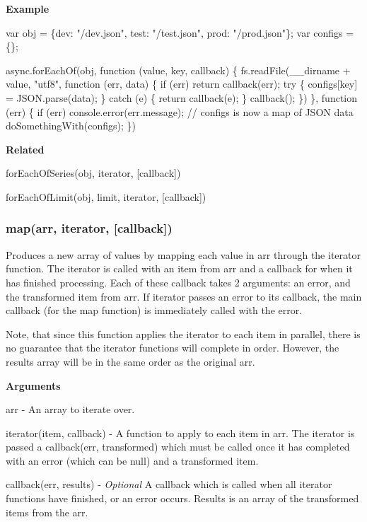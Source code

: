 {\bfseries Example}


\begin{DoxyCode}
var obj = \{dev: "/dev.json", test: "/test.json", prod: "/prod.json"\};
var configs = \{\};

async.forEachOf(obj, function (value, key, callback) \{
  fs.readFile(\_\_dirname + value, "utf8", function (err, data) \{
    if (err) return callback(err);
    try \{
      configs[key] = JSON.parse(data);
    \} catch (e) \{
      return callback(e);
    \}
    callback();
  \})
\}, function (err) \{
  if (err) console.error(err.message);
  // configs is now a map of JSON data
  doSomethingWith(configs);
\})
\end{DoxyCode}


{\bfseries Related}


\begin{DoxyItemize}
\item for\+Each\+Of\+Series(obj, iterator, \mbox{[}callback\mbox{]})
\item for\+Each\+Of\+Limit(obj, limit, iterator, \mbox{[}callback\mbox{]}) 


\end{DoxyItemize}

\label{_map}%
 \subsubsection*{map(arr, iterator, \mbox{[}callback\mbox{]})}

Produces a new array of values by mapping each value in {\ttfamily arr} through the {\ttfamily iterator} function. The {\ttfamily iterator} is called with an item from {\ttfamily arr} and a callback for when it has finished processing. Each of these callback takes 2 arguments\+: an {\ttfamily error}, and the transformed item from {\ttfamily arr}. If {\ttfamily iterator} passes an error to its callback, the main {\ttfamily callback} (for the {\ttfamily map} function) is immediately called with the error.

Note, that since this function applies the {\ttfamily iterator} to each item in parallel, there is no guarantee that the {\ttfamily iterator} functions will complete in order. However, the results array will be in the same order as the original {\ttfamily arr}.

{\bfseries Arguments}


\begin{DoxyItemize}
\item {\ttfamily arr} -\/ An array to iterate over.
\item {\ttfamily iterator(item, callback)} -\/ A function to apply to each item in {\ttfamily arr}. The iterator is passed a {\ttfamily callback(err, transformed)} which must be called once it has completed with an error (which can be {\ttfamily null}) and a transformed item.
\item {\ttfamily callback(err, results)} -\/ {\itshape Optional} A callback which is called when all {\ttfamily iterator} functions have finished, or an error occurs. Results is an array of the transformed items from the {\ttfamily arr}.
\end{DoxyItemize}

